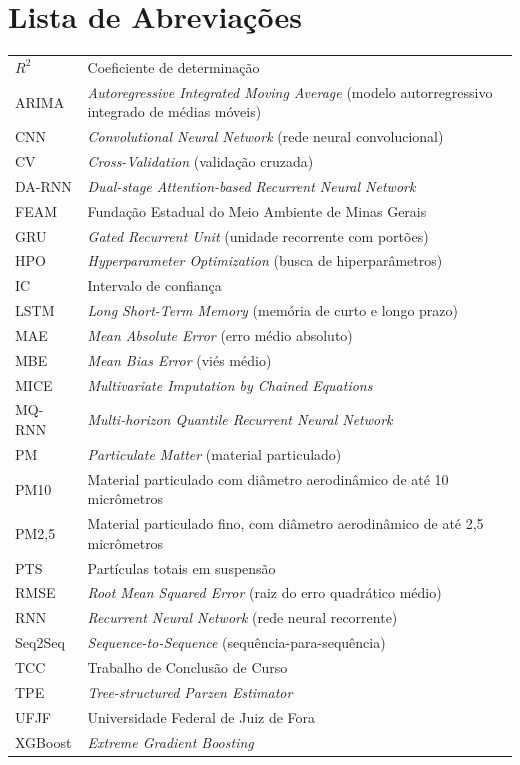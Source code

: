 \tableofcontents \thispagestyle{empty}
\listoffigures \thispagestyle{empty}
\listoftables \thispagestyle{empty}

\chapter*{Lista de Abreviações}
\begingroup
\footnotesize
\renewcommand{\arraystretch}{0.86}
\setlength{\tabcolsep}{3pt}
\begin{tabular}{@{}p{}p{}@{}}
	\(R^2\) & Coeficiente de determinação \\
	ARIMA & \textit{Autoregressive Integrated Moving Average} (modelo autorregressivo integrado de médias móveis) \\
	CNN & \textit{Convolutional Neural Network} (rede neural convolucional) \\
	CV & \textit{Cross-Validation} (validação cruzada) \\
	DA-RNN & \textit{Dual-stage Attention-based Recurrent Neural Network} \\
	FEAM & Fundação Estadual do Meio Ambiente de Minas Gerais \\
	GRU & \textit{Gated Recurrent Unit} (unidade recorrente com portões) \\
	HPO & \textit{Hyperparameter Optimization} (busca de hiperparâmetros) \\
	IC & Intervalo de confiança \\
	LSTM & \textit{Long Short-Term Memory} (memória de curto e longo prazo) \\
	MAE & \textit{Mean Absolute Error} (erro médio absoluto) \\
	MBE & \textit{Mean Bias Error} (viés médio) \\
	MICE & \textit{Multivariate Imputation by Chained Equations} \\
	MQ-RNN & \textit{Multi-horizon Quantile Recurrent Neural Network} \\
	PM & \textit{Particulate Matter} (material particulado) \\
	PM10 & Material particulado com diâmetro aerodinâmico de até 10 micrômetros \\
	PM2,5 & Material particulado fino, com diâmetro aerodinâmico de até 2,5 micrômetros \\
	PTS & Partículas totais em suspensão \\
	RMSE & \textit{Root Mean Squared Error} (raiz do erro quadrático médio) \\
	RNN & \textit{Recurrent Neural Network} (rede neural recorrente) \\
	Seq2Seq & \textit{Sequence-to-Sequence} (sequência-para-sequência) \\
	TCC & Trabalho de Conclusão de Curso \\
	TPE & \textit{Tree-structured Parzen Estimator} \\
	UFJF & Universidade Federal de Juiz de Fora \\
	XGBoost & \textit{Extreme Gradient Boosting} \\
\end{tabular}
\endgroup
\thispagestyle{empty}
